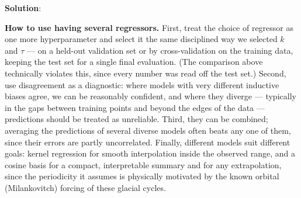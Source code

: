 \documentclass[submit]{../harvardml}
\newenvironment{solution}{
    \vspace{2mm}
    \color{blue}\noindent\textbf{Solution}:
}{}
\begin{document}
\begin{solution}
\begin{enumerate}
\textbf{How to use having several regressors.} First, treat the choice of
regressor as one more hyperparameter and select it the same disciplined way we
selected $k$ and $\tau$ --- on a held-out validation set or by cross-validation
on the training data, keeping the test set for a single final evaluation. (The
comparison above technically violates this, since every number was read off the
test set.) Second, use disagreement as a diagnostic: where models with very
different inductive biases agree, we can be reasonably confident, and where they
diverge --- typically in the gaps between training points and beyond the edges
of the data --- predictions should be treated as unreliable. Third, they can be
combined; averaging the predictions of several diverse models often beats any
one of them, since their errors are partly uncorrelated. Finally, different
models suit different goals: kernel regression for smooth interpolation inside
the observed range, and a cosine basis for a compact, interpretable summary and
for any extrapolation, since the periodicity it assumes is physically motivated
by the known orbital (Milankovitch) forcing of these glacial cycles.

\end{enumerate}

\end{solution}

\newpage
\end{document}
